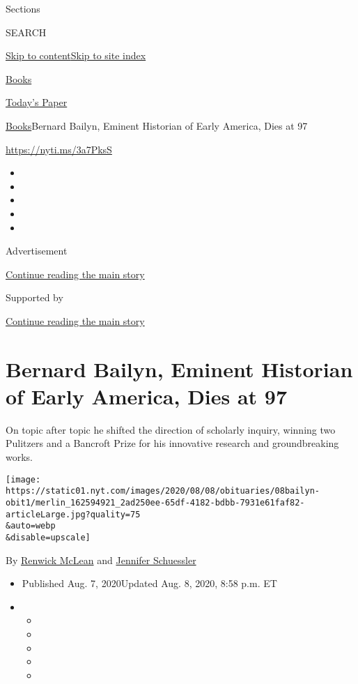 Sections

SEARCH

\protect\hyperlink{site-content}{Skip to
content}\protect\hyperlink{site-index}{Skip to site index}

\href{https://www.nytimes.com/section/books}{Books}

\href{https://myaccount.nytimes.com/auth/login?response_type=cookie\&client_id=vi}{}

\href{https://www.nytimes.com/section/todayspaper}{Today's Paper}

\href{/section/books}{Books}\textbar{}Bernard Bailyn, Eminent Historian
of Early America, Dies at 97

\href{https://nyti.ms/3a7PksS}{https://nyti.ms/3a7PksS}

\begin{itemize}
\item
\item
\item
\item
\item
\end{itemize}

Advertisement

\protect\hyperlink{after-top}{Continue reading the main story}

Supported by

\protect\hyperlink{after-sponsor}{Continue reading the main story}

\hypertarget{bernard-bailyn-eminent-historian-of-early-america-dies-at-97}{%
\section{Bernard Bailyn, Eminent Historian of Early America, Dies at
97}\label{bernard-bailyn-eminent-historian-of-early-america-dies-at-97}}

On topic after topic he shifted the direction of scholarly inquiry,
winning two Pulitzers and a Bancroft Prize for his innovative research
and groundbreaking works.

\texttt{[image: https://static01.nyt.com/images/2020/08/08/obituaries/08bailyn-obit1/merlin\_162594921\_2ad250ee-65df-4182-bdbb-7931e61faf82-articleLarge.jpg?quality=75\\\&auto=webp\\\&disable=upscale]}

By \href{https://www.nytimes.com/by/renwick-mclean}{Renwick McLean} and
\href{https://www.nytimes.com/by/jennifer-schuessler}{Jennifer
Schuessler}

\begin{itemize}
\item
  Published Aug. 7, 2020Updated Aug. 8, 2020, 8:58 p.m. ET
\item
  \begin{itemize}
  \item
  \item
  \item
  \item
  \item
  \end{itemize}
\end{itemize}

